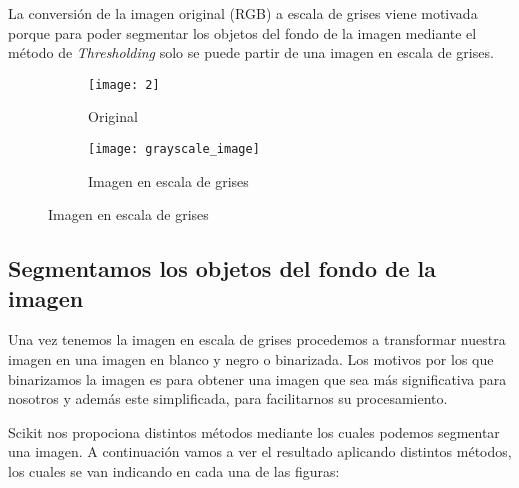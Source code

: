 La conversión de la imagen original (RGB) a escala de grises viene motivada porque para poder segmentar los objetos del fondo de la imagen mediante el método de \textit{Thresholding} solo se puede partir de una imagen en escala de grises.

\begin{figure}
	\centering
	\begin{subfigure}[b]{0.45\textwidth}
        \texttt{[image: 2]}
        \caption{Original}
    \end{subfigure}
    \begin{subfigure}[b]{0.45\textwidth}
        \texttt{[image: grayscale\_image]}
        \caption{Imagen en escala de grises}
    \end{subfigure}
\end{figure}

\subsection{Segmentamos los objetos del fondo de la imagen}

Una vez tenemos la imagen en escala de grises procedemos a transformar nuestra imagen en una imagen en blanco y negro o binarizada. Los motivos por los que binarizamos la imagen es para obtener una imagen que sea más significativa para nosotros y además este simplificada, para facilitarnos su procesamiento.

Scikit nos propociona distintos métodos mediante los cuales podemos segmentar una imagen. A continuación vamos a ver el resultado aplicando distintos métodos, los cuales se van indicando en cada una de las figuras:

